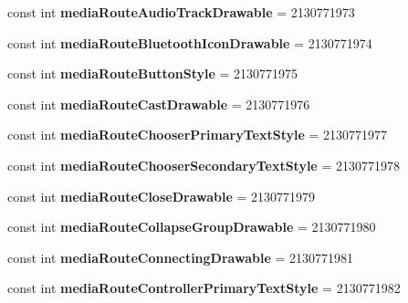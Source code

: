 \begin{DoxyCompactItemize}
const int {\bfseries media\+Route\+Audio\+Track\+Drawable} = 2130771973
\item 
\mbox{\label{classXaria_1_1Resource_1_1Attribute_a6e57107a46a0b8dab400289fbc1fe2b5}} 
const int {\bfseries media\+Route\+Bluetooth\+Icon\+Drawable} = 2130771974
\item 
\mbox{\label{classXaria_1_1Resource_1_1Attribute_af91c8dfdef6d22d807e545c7bf4b27ea}} 
const int {\bfseries media\+Route\+Button\+Style} = 2130771975
\item 
\mbox{\label{classXaria_1_1Resource_1_1Attribute_a09ce0bf2ec5eac83376ec8c32cec186f}} 
const int {\bfseries media\+Route\+Cast\+Drawable} = 2130771976
\item 
\mbox{\label{classXaria_1_1Resource_1_1Attribute_ad31ef0a0ae1e1cfec88921e3df155785}} 
const int {\bfseries media\+Route\+Chooser\+Primary\+Text\+Style} = 2130771977
\item 
\mbox{\label{classXaria_1_1Resource_1_1Attribute_a26eae8ead29ef899ae800e297d80444c}} 
const int {\bfseries media\+Route\+Chooser\+Secondary\+Text\+Style} = 2130771978
\item 
\mbox{\label{classXaria_1_1Resource_1_1Attribute_aed8869a50af9150c58ae3c9a8e1dee0a}} 
const int {\bfseries media\+Route\+Close\+Drawable} = 2130771979
\item 
\mbox{\label{classXaria_1_1Resource_1_1Attribute_a2ceae6e872492f824cecb542ec1c00ac}} 
const int {\bfseries media\+Route\+Collapse\+Group\+Drawable} = 2130771980
\item 
\mbox{\label{classXaria_1_1Resource_1_1Attribute_a577a380ed4b81a8d6d2973e38a2b56f5}} 
const int {\bfseries media\+Route\+Connecting\+Drawable} = 2130771981
\item 
\mbox{\label{classXaria_1_1Resource_1_1Attribute_a5da5f5d941f8bfa26e83fee0af0d66f3}} 
const int {\bfseries media\+Route\+Controller\+Primary\+Text\+Style} = 2130771982

\end{DoxyCompactItemize}
